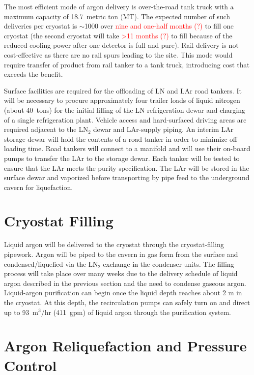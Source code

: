 The most efficient mode of argon delivery is 
over-the-road tank truck with a maximum capacity of 18.7~metric ton (MT).  
The expected number of such deliveries per cryostat is $\sim$1000 
over \textcolor{red}{nine and one-half months (?)} to fill one 
cryostat (the second cryostat will take \textcolor{red}{>11 months (?)} 
to fill because of the reduced cooling power after one detector is full and pure). 
Rail delivery is not cost-effective as there are no rail spurs leading
to the site. This mode would require transfer of product from rail 
tanker to a tank truck, introducing cost that exceeds the benefit.

Surface facilities are required for the offloading of LN and LAr road tankers. It will be necessary to  procure approximately four trailer loads of liquid nitrogen (about 40~tons) for the initial filling of the LN refrigeration dewar and charging of a single refrigeration plant. Vehicle access and hard-surfaced driving areas are required adjacent to the LN$_{2}$ dewar and LAr-supply piping. An interim LAr storage dewar will hold the contents of a road tanker in order to minimize off-loading time.  Road tankers will connect to a manifold and will use their on-board pumps to transfer the LAr to the storage 
dewar. Each tanker will be tested to ensure that the LAr meets the purity specification. The LAr will be 
stored in the surface dewar and vaporized before transporting by pipe feed to the
underground cavern for liquefaction.

\section{Cryostat Filling}

Liquid argon will be delivered to the cryostat through the cryostat-filling pipework. Argon will
be piped to the cavern in gas form from the surface
and condensed/liquefied via the LN$_{2}$ exchange in the condenser units.
The filling process will take place over many weeks due to the delivery schedule of liquid
argon described in the previous section and the need to condense gaseous argon.
Liquid-argon purification can begin once the liquid
depth reaches about 2 m in the cryostat. At this depth, the recirculation pumps can safely
turn on and direct up to 93~m$^{3}$/hr (411~gpm) of liquid argon through the purification system.

\section{Argon Reliquefaction and Pressure Control}
\label{subsec:reliquef}

